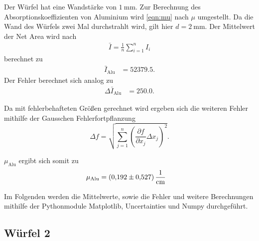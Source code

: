 Der Würfel hat eine Wandstärke von $\qty{1}{\milli\meter}$.
Zur Berechnung des Absorptionskoeffizienten von Aluminium wird \autoref{eqn:mu} nach $\mu$ umgestellt.
Da die Wand des Würfels zwei Mal durchstrahlt wird, gilt hier $d=\qty{2}{\milli\meter}$.
Der Mittelwert der Net Area wird nach 
\begin{align*}
  \bar{I}=\frac{1}{n} \sum_{i=1}^n I_i \label{eqn:Mittelwert}
\end{align*}
berechnet zu 
\begin{align*}
  \bar{I}_{\text{Alu}} &=  52379.5.
\end{align*}
Der Fehler berechnet sich analog zu
\begin{align*}
  \Delta \bar{I}_{\text{Alu}} &=  250.0.
\end{align*}

Da mit fehlerbehafteten Größen gerechnet wird ergeben sich die weiteren Fehler mithilfe der Gausschen Fehlerfortpflanzung
\begin{equation*}
  \Delta f=\sqrt{\sum_{j=1}^n \left(\frac{\partial f}{\partial x_j}\Delta x_j \right)^{2}}.\label{eqn:Gauß}
\end{equation*}

$\mu_{\text{Alu}}$ ergibt sich somit zu 
\begin{align*}
  \mu_{\text{Alu}} &= \qty{0.192 \pm 0.527}{\per\centi\meter}
\end{align*}

Im Folgenden werden die Mittelwerte, sowie die Fehler und weitere Berechnungen mithilfe der Pythonmodule Matplotlib\cite{matplotlib},
Uncertainties\cite{uncertainties} und Numpy\cite{numpy} durchgeführt.


\subsection{Würfel 2}
\label{sub:2}

